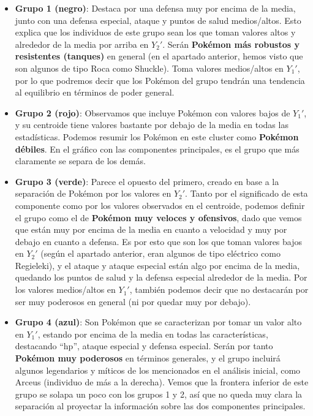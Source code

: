 \documentclass[
  12pt,
]{extreport}
\begin{document}
\begin{itemize}
\item
  \textbf{Grupo 1 (negro)}: Destaca por una defensa muy por encima de la
  media, junto con una defensa especial, ataque y puntos de salud
  medios/altos. Esto explica que los individuos de este grupo sean los
  que toman valores altos y alrededor de la media por arriba en
  \(Y_2'\). Serán \textbf{Pokémon más robustos y resistentes (tanques)}
  en general (en el apartado anterior, hemos visto que son algunos de
  tipo Roca como Shuckle). Toma valores medios/altos en \(Y_1'\), por lo
  que podremos decir que los Pokémon del grupo tendrán una tendencia al
  equilibrio en términos de poder general.
\item
  \textbf{Grupo 2 (rojo)}: Observamos que incluye Pokémon con valores
  bajos de \(Y_1'\), y su centroide tiene valores bastante por debajo de
  la media en todas las estadísticas. Podemos resumir los Pokémon en
  este cluster como \textbf{Pokémon débiles}. En el gráfico con las
  componentes principales, es el grupo que más claramente se separa de
  los demás.
\item
  \textbf{Grupo 3 (verde)}: Parece el opuesto del primero, creado en
  base a la separación de Pokémon por los valores en \(Y_2'\). Tanto por
  el significado de esta componente como por los valores observados en
  el centroide, podemos definir el grupo como el de \textbf{Pokémon muy
  veloces y ofensivos}, dado que vemos que están muy por encima de la
  media en cuanto a velocidad y muy por debajo en cuanto a defensa. Es
  por esto que son los que toman valores bajos en \(Y_2'\) (según el
  apartado anterior, eran algunos de tipo eléctrico como Regieleki), y
  el ataque y ataque especial están algo por encima de la media,
  quedando los puntos de salud y la defensa especial alrededor de la
  media. Por los valores medios/altos en \(Y_1'\), también podemos decir
  que no destacarán por ser muy poderosos en general (ni por quedar muy
  por debajo).
\item
  \textbf{Grupo 4 (azul)}: Son Pokémon que se caracterizan por tomar un
  valor alto en \(Y_1'\), estando por encima de la media en todas las
  características, destacando ``hp'', ataque especial y defensa
  especial. Serán por tanto \textbf{Pokémon muy poderosos} en términos
  generales, y el grupo incluirá algunos legendarios y míticos de los
  mencionados en el análisis inicial, como Arceus (individuo de más a la
  derecha). Vemos que la frontera inferior de este grupo se solapa un
  poco con los grupos 1 y 2, así que no queda muy clara la separación al
  proyectar la información sobre las dos componentes principales.
\end{itemize}
\end{document}
